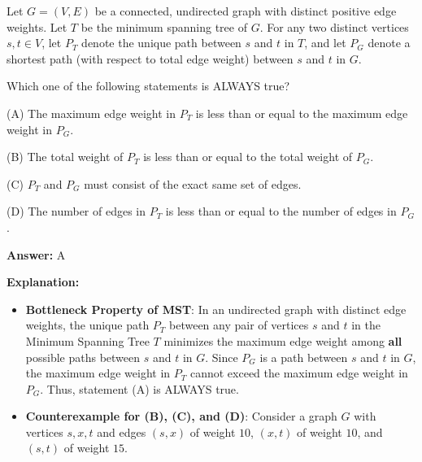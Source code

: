 \begin{tcolorbox}[enhanced,breakable,colback=boxgray,colframe=gray!45,boxrule=0.4pt,arc=2pt,left=6pt,right=6pt,top=4pt,bottom=4pt,title={Q.47},fonttitle=\bfseries\small,coltitle=black,colbacktitle=gray!15]
\small Let $G = (V, E)$ be a connected, undirected graph with distinct positive edge weights. Let $T$ be the minimum spanning tree of $G$. For any two distinct vertices $s, t \in V$, let $P_T$ denote the unique path between $s$ and $t$ in $T$, and let $P_G$ denote a shortest path (with respect to total edge weight) between $s$ and $t$ in $G$.\par
Which one of the following statements is ALWAYS true?\par\par\hspace*{1em}(A) The maximum edge weight in $P_T$ is less than or equal to the maximum edge weight in $P_G$.\par\hspace*{1em}(B) The total weight of $P_T$ is less than or equal to the total weight of $P_G$.\par\hspace*{1em}(C) $P_T$ and $P_G$ must consist of the exact same set of edges.\par\hspace*{1em}(D) The number of edges in $P_T$ is less than or equal to the number of edges in $P_G$.\par{}\par\smallskip\textbf{Answer:} A\par\par\textbf{Explanation:} \begin{itemize}[leftmargin=1.4em,itemsep=1pt]
\item \textbf{Bottleneck Property of MST}: In an undirected graph with distinct edge weights, the unique path $P_T$ between any pair of vertices $s$ and $t$ in the Minimum Spanning Tree $T$ minimizes the maximum edge weight among \textbf{all} possible paths between $s$ and $t$ in $G$. Since $P_G$ is a path between $s$ and $t$ in $G$, the maximum edge weight in $P_T$ cannot exceed the maximum edge weight in $P_G$. Thus, statement (A) is ALWAYS true.
\end{itemize}
\begin{itemize}[leftmargin=1.4em,itemsep=1pt]
\item \textbf{Counterexample for (B), (C), and (D)}: Consider a graph $G$ with vertices $s, x, t$ and edges $(s, x)$ of weight $10$, $(x, t)$ of weight $10$, and $(s, t)$ of weight $15$.

\end{itemize}
\end{tcolorbox}
